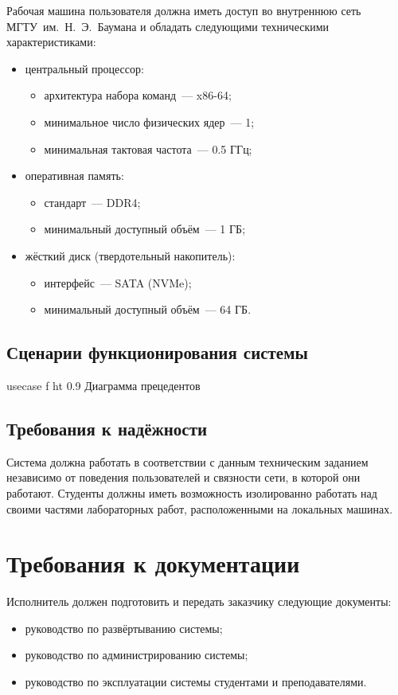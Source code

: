 \documentclass{bmstu}
\begin{document}
  Рабочая машина пользователя должна иметь доступ во внутреннюю сеть
  МГТУ~им.~Н.~Э.~Баумана и обладать следующими техническими
  характеристиками:
  \begin{itemize}[label=---]
    \item центральный процессор:
      \begin{itemize}[label=---]
        \item архитектура набора команд~--- x86-64;
        \item минимальное число физических ядер~--- 1;
        \item минимальная тактовая частота~--- 0.5 ГГц;
      \end{itemize}
    \item оперативная память:
      \begin{itemize}[label=---]
        \item стандарт~--- DDR4;
        \item минимальный доступный объём~--- 1 ГБ;
      \end{itemize}
    \item жёсткий диск (твердотельный накопитель):
      \begin{itemize}[label=---]
        \item интерфейс~--- SATA (NVMe);
        \item минимальный доступный объём~--- 64 ГБ.
      \end{itemize}
  \end{itemize}

  \subsection{Сценарии функционирования системы}

    {usecase}
    {f}
    {ht}
    {0.9 \textwidth}
    {Диаграмма прецедентов}

  \FloatBarrier

  \subsection{Требования к надёжности}

  Система должна работать в соответствии с данным техническим заданием
  независимо от поведения пользователей и связности сети, в которой
  они работают.
  Студенты должны иметь возможность изолированно работать над своими
  частями лабораторных работ, расположенными на локальных машинах.

  \section{Требования к документации}

  Исполнитель должен подготовить и передать заказчику следующие
  документы:
  \begin{itemize}[label=---]
    \item руководство по развёртыванию системы;
    \item руководство по администрированию системы;
    \item руководство по эксплуатации системы студентами и
      преподавателями.
  \end{itemize}
\end{document}
